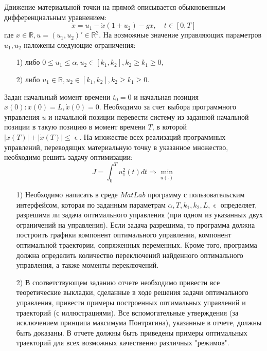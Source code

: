 \documentclass[11pt]{article}
\begin{document}
	{\hspace{0.4cm} Движение материальной точки на прямой описывается обыкновенным дифференциальным уравнением:}
	\begin{equation}
	\ddot{x} = u_1 - \dot{x}(1 + u_2) - gx, \quad t \in [0, T] 
	\end{equation}  
	{где $x \in \mathbb{R} , u = (u_1,u_2)' \in \mathbb{R}^2$. На возможные значение управляющих параметров $u_1,u_2$ наложены следующие ограничения:}
	\begin{itemize}
		\item[1)]{либо $0 \leq u_1 \leq \alpha, u_2 \in[k_1,k_2],k_2 \geq k_1 \geq 0, $} 
		\item[2)]{либо $u_1 \in \mathbb{R}, u_2 \in [k_1,k_2], k_2 \geq k_1 \geq 0.$}
	\end{itemize}
	{Задан начальный момент времени $t_0 = 0$ и начальная позиция $x(0) : x(0) = L, \dot{x}(0) = 0.$}
	{Необходимо за счет выбора программного управления $u$ и начальной позиции перевести систему из заданной начальной позиции в такую позицию в момент времени $T$, в которой $|x(T)| + |\dot{x}(T)| \leq \upvarepsilon$. На множестве всех реализаций программных управлений, переводящих материальную точку в указанное множество, необходимо решить задачу оптимизации:}
	\begin{equation}
		J = \int_{0}^{T} u_1^2(t)dt \Rightarrow \underset{u(\cdot)}{\min}
	\end{equation}
	
	
	\begin{itemize}
		\item[1)]{Необходимо написать в среде $MatLab$ программу с пользовательским интерфейсом, которая по заданным параметрам $\alpha,T,k_1,k_2,L,\upvarepsilon$ определяет, разрешима ли задача оптимального управления (при одном из указанных двух ограничений на управления). Если задача разрешима, то программа должна построить графики компонент оптимального управления, компонент оптимальной траектории, сопряженных переменных. Кроме того, программа должна определить количество переключений найденного оптимального управления, а также моменты переключений.} 
		\item[2)]{В соответствующем заданию отчете необходимо привести все теоретические выкладки, сделанные в ходе решения задачи оптимального управления, привести примеры построенных оптимальных управлений и траекторий (с иллюстрациями). Все вспомогательные утверждения (за исключением принципа максимума Понтрягина), указанные в отчете, должны быть доказаны. В отчете должны быть приведены примеры оптимальных траекторий для всех возможных качественно различных "режимов".}
	\end{itemize}
	
\end{document}
